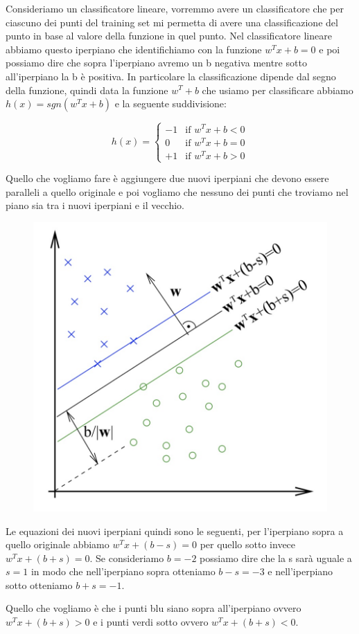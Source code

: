 \documentclass[14pt]{extreport}
\begin{document}
Consideriamo un classificatore lineare, vorremmo avere un classificatore che per ciascuno dei punti del training set mi permetta di avere una
classificazione del punto in base al valore della funzione in quel punto. Nel classificatore lineare abbiamo questo iperpiano che identifichiamo con
la funzione $w^Tx+b=0$ e poi possiamo dire che sopra l'iperpiano avremo un b negativa mentre sotto all'iperpiano la b è positiva. In particolare la
classificazione dipende dal segno della funzione, quindi data la funzione $w^T +b$ che usiamo per classificare abbiamo $h(x) = sgn(w^Tx+b)$ e la
seguente suddivisione:


\begin{equation}
	h(x)=
	\begin{cases}
		-1 & \text{if $w^Tx+b < 0$} \\
		0  & \text{if $w^Tx+b = 0$} \\
		+1 & \text{if $w^Tx+b > 0$}
	\end{cases}
	\label{eq4}
\end{equation}


Quello che vogliamo fare è aggiungere due nuovi iperpiani che devono essere paralleli a quello originale e poi vogliamo che nessuno dei punti che
troviamo nel piano sia tra i nuovi iperpiani e il vecchio.

\begin{figure}[H]
	\centering
	\includegraphics[width=0.5\linewidth]{314.jpeg}
\end{figure}

Le equazioni dei nuovi iperpiani quindi sono le seguenti, per l'iperpiano sopra a quello originale abbiamo $w^Tx+(b-s)=0$ per quello sotto invece
$w^Tx+(b+s)=0$. Se consideriamo $b=-2$ possiamo dire che la s sarà uguale a $s=1$ in modo che nell'iperpiano sopra otteniamo $b-s=-3$ e nell'iperpiano
sotto otteniamo $b+s = -1$.

Quello che vogliamo è che i punti blu siano sopra all'iperpiano ovvero $w^Tx+(b+s)>0$ e i punti verdi sotto ovvero $w^Tx+(b+s)<0$.
\end{document}
